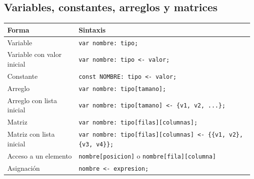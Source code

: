 \documentclass[spanish,11pt,letterpaper]{article}
\begin{document}
	\subsection{Variables, constantes, arreglos y matrices}
	\begin{center}
		\begin{tabular}{@{}ll@{}}
			\toprule
			\textbf{Forma} & \textbf{Sintaxis} \\
			\midrule
			Variable & \texttt{var nombre: tipo;} \\
			Variable con valor inicial & \texttt{var nombre: tipo <- valor;} \\
			Constante & \texttt{const NOMBRE: tipo <- valor;} \\
			Arreglo & \texttt{var nombre: tipo[tamano];} \\
			Arreglo con lista inicial & \texttt{var nombre: tipo[tamano] <- \{v1, v2, ...\};} \\
			Matriz & \texttt{var nombre: tipo[filas][columnas];} \\
			Matriz con lista inicial & \texttt{var nombre: tipo[filas][columnas] <- \{\{v1, v2\}, \{v3, v4\}\};} \\
			Acceso a un elemento & \texttt{nombre[posicion]} \quad o \quad \texttt{nombre[fila][columna]} \\
			Asignaci\'on & \texttt{nombre <- expresion;} \\
			\bottomrule
		\end{tabular}
	\end{center}
	
\end{document}

